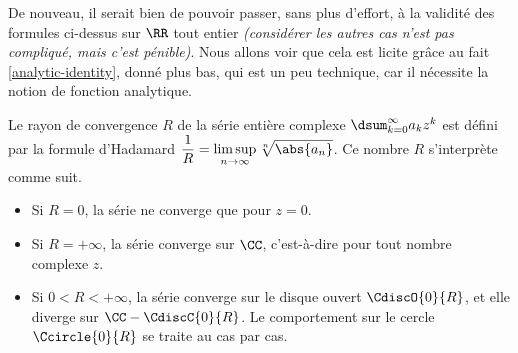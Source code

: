 De nouveau, il serait bien de pouvoir passer, sans plus d'effort, à la validité des formules ci-dessus sur $\RR$ tout entier \emph{(considérer les autres cas n'est pas compliqué, mais c'est pénible)}.
%
Nous allons voir que cela est licite grâce au fait \ref{analytic-identity}, donné plus bas, qui est un peu technique, car il nécessite la notion de fonction analytique.




\begin{preli} \label{XXX}
    Le rayon de convergence $R$ de la série entière complexe $\dsum_{k=0}^{\infty} a_k z^k$ est défini par la formule d'Hadamard
    $\displaystyle \frac{1}{R} = \limsup_{n \to \infty} \sqrt[n]{\abs{a_n}}$.
    Ce nombre $R$ s'interprète comme suit.
    \begin{itemize}
        \item Si $R = 0$, la série ne converge que pour $z = 0$.

        \item Si $R = +\infty$, la série converge sur $\CC$, c'est-à-dire pour tout nombre complexe $z$.

        \item Si $0 < R < +\infty$, la série converge sur le disque ouvert $\CdiscO{0}{R}$, et elle diverge sur $\CC - \CdiscC{0}{R}$. Le comportement sur le cercle $\Ccircle{0}{R}$ se traite au cas par cas.
    \end{itemize}
\end{preli}


